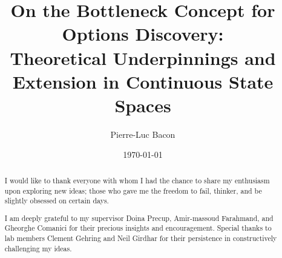 \documentclass[12pt, oneside, extrafontsizes]{memoir}  %
\theoremstyle{plain}
\theoremstyle{definition}
\begin{document}

\pretitle{\begin{center}\cftchapterfont\huge}
\posttitle{\end{center}}
\preauthor{\begin{center}\huge}
\postauthor{\end{center}}
\predate{\begin{center}\large}
\postdate{\end{center}}

\title{On the Bottleneck Concept for Options Discovery: \\ \large{Theoretical Underpinnings and Extension in Continuous State Spaces} }
\author{Pierre-Luc Bacon}
\date{\today}
\renewcommand\maketitlehookb{
\vfill
}
\renewcommand\maketitlehookc{
\vfill
\begin{center}
{
\large
Computer Science\\
McGill University, Montreal
}
\end{center}
\vspace{10mm}
}
\renewcommand\maketitlehookd{
\vspace{10mm}
A thesis submitted to McGill University in partial fulfilment of the requirements of
the degree of Master of Science.
\copyright Pierre-Luc Bacon; \today.
}

\begin{titlingpage}
\maketitle
\end{titlingpage}


\clearpage
{}
\renewcommand{\abstractname}{Acknowledgements}
\begin{abstract}
I would like to thank everyone with whom I had the chance to share my 
enthusiasm upon exploring new ideas; those who gave me the freedom to fail, thinker,
and be slightly obsessed on certain days.

I am deeply grateful to my supervisor Doina Precup, Amir-massoud Farahmand, and Gheorghe Comanici for their precious insights and encouragement. Special thanks to lab members Clement Gehring and Neil Girdhar for their persistence in constructively challenging my ideas.
\end{abstract}
\end{document}
